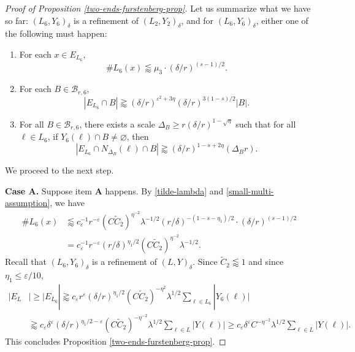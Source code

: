 \documentclass{amsart}
\numberwithin{equation}{section}
\newcommand{\de}{\delta}
\newcommand{\De}{\Delta}
\newcommand{\e}{\varepsilon}
\newcommand{\la}{\lambda}
\newcommand{\cb}{\mathcal B}
\begin{document}
\begin{proof}[Proof of Proposition \ref{two-ends-furstenberg-prop}]
Let us summarize what we have so far: $(L_6, Y_6)_\de$ is a refinement of $(L_2, Y_2)_\de$, and for $(L_6, Y_6)_\de$, either one of the following must happen:
\begin{enumerate}
    \item[{\bf A.}]  For each $x\in E_{L_6}$, 
    \begin{equation}
        \# L_6(x)\lessapprox \mu_3\cdot (\de/r)^{(s-1)/2}.
    \end{equation}
    \item[{\bf B.}] For each $B\in\cb_{r,6}$,
    \begin{equation}
        |E_{L_6}\cap B|\gtrapprox (\de/r)^{\e^2+3\eta}(\de/r)^{3(1-s)/2}|B|.
    \end{equation} 
    \item[{\bf C.}] For all $B\in\cb_{r,6}$, there exists a scale $\De_B\geq r(\de/r)^{1-\sqrt{\eta}}$ such that for all $\ell\in L_6$, if $Y_6(\ell)\cap B\not=\varnothing$, then
    \begin{equation}
        |E_{L_6}\cap N_{\De_B}(\ell)\cap B|\gtrapprox  (\de/r)^{1-s+2\eta}(\De_B r).
    \end{equation}
\end{enumerate}
We proceed to the next step.

\medskip


\smallskip

{\bf Case A.} Suppose item {\bf A} happens. 
By \eqref{tilde-lambda} and \eqref{small-multi-assumption}, we have 
\begin{align}
    \#L_6(x)&\lessapprox c_\e^{-1} r^{-\e}(C\tilde C_2)^{\eta^{-2}}   \la^{-1/2} (r/\de)^{-(1-s-\eta_1)/2}\cdot (\de/r)^{(s-1)/2}\\
    &= c_\e^{-1}r^{-\e}(r/\de)^{\eta_1/2}(C\tilde C_2)^{\eta^{-2}} \la^{-1/2}.
\end{align}
Recall that $(L_6, Y_6)_\de$ is a refinement of $(L,Y)_\de$. 
Since $\tilde C_2\lessapprox1$ and since $\eta_1\leq\e/10$, 
\begin{align}
    |E_L&|\geq|E_{L_6}|\gtrapprox c_\e r^{\e}(\de/r)^{\eta_1/2}(C\tilde C_2)^{-\eta^2}  \la^{1/2}\sum_{\ell\in L_6}|Y_6(\ell)|\\
    &\gtrapprox c_\e \de^{\e}(\de/r)^{\eta_1/2-\e}(C\tilde C_2)^{-\eta^{-2}}\la^{1/2}\sum_{\ell\in L}|Y(\ell)|\geq c_\e\de^{\e}C^{-\eta^{-2}}\la^{1/2}\sum_{\ell\in L}|Y(\ell)|.
\end{align}
This concludes Proposition \ref{two-ends-furstenberg-prop}.


\end{proof}
\end{document}
